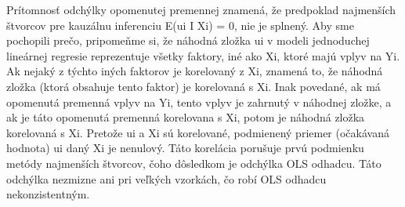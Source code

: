 \documentclass[]{tukediphc}
\begin{document}
Prítomnosť odchýlky opomenutej premennej znamená, že predpoklad najmenších štvorcov pre kauzálnu inferenciu E(ui I Xi) = 0, nie je splnený. Aby sme pochopili prečo, pripomeňme si, že náhodná zložka ui v modeli jednoduchej lineárnej regresie reprezentuje všetky faktory, iné ako Xi, ktoré majú vplyv na Yi. Ak nejaký z týchto iných faktorov je korelovaný z Xi, znamená to, že náhodná zložka (ktorá obsahuje tento faktor) je korelovaná s Xi. Inak povedané, ak má opomenutá premenná vplyv na Yi, tento vplyv je zahrnutý v náhodnej zložke, a ak je táto opomenutá premenná korelovana s Xi, potom je náhodná zložka korelovaná s Xi. Pretože ui a Xi sú korelované, podmienený priemer (očakávaná hodnota) ui daný Xi je nenulový. Táto korelácia porušuje prvú podmienku metódy najmenších štvorcov, čoho dôsledkom je odchýlka OLS odhadcu. Táto odchýlka nezmizne ani pri veľkých vzorkách, čo robí OLS odhadcu nekonzistentným. 










%

%

%

%

%

%

%
\newpage
{}
\protect\label{page:posledna}
\end{document}
